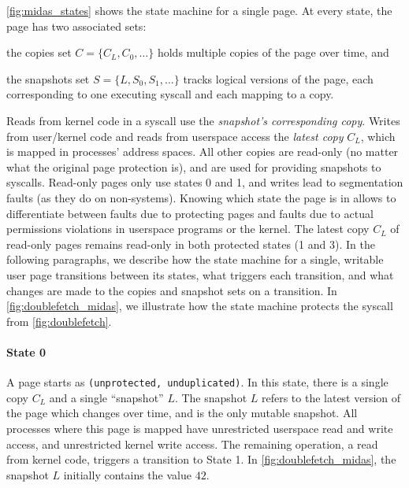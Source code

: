 \documentclass[letterpaper,twocolumn,10pt]{article}
\begin{document}
\autoref{fig:midas_states} shows the state machine for a single page.
At every state, the page has two associated sets:
\begin{inparaenum}
  \item the copies set $C = \{C_L, C_0, \dots\}$ holds multiple copies of the page over time, and
  \item the snapshots set $S = \{L, S_0, S_1, \dots\}$ tracks logical versions of the page, each corresponding to one executing syscall and each mapping to a copy.
\end{inparaenum}
Reads from kernel code in a syscall use the \emph{snapshot's corresponding copy}.
Writes from user/kernel code and reads from userspace access the \emph{latest
copy} $C_L$, which is mapped in processes' address spaces.
All other copies are read-only (no matter what the original page protection is), and are used for providing snapshots to syscalls.
Read-only pages only use states 0 and 1, and writes lead to segmentation faults
(as they do on non-\midas systems).
Knowing which state the page is in allows \midas to differentiate between
faults due to \midas protecting pages and faults due to actual permissions
violations in userspace programs or the kernel.
The latest copy $C_L$ of read-only pages remains read-only in both
protected states (1 and 3).
In the following paragraphs, we describe how the state machine for a single,
writable user page transitions between its states, what triggers each transition,
and what changes are made to the copies and snapshot sets on a transition.
In \autoref{fig:doublefetch_midas}, we illustrate how the state machine protects the
syscall from \autoref{fig:doublefetch}.

\paragraph{State 0}
A page starts as \texttt{(unprotected, unduplicated)}.
In this state, there is a single copy $C_L$ and a single ``snapshot'' $L$.
The snapshot $L$ refers to the latest version of the page which changes
over time, and is the only mutable snapshot.
All processes where this page is mapped have unrestricted userspace read and write
access, and unrestricted kernel write access.
The remaining operation, a read from kernel code, triggers a transition to
State 1.
In \autoref{fig:doublefetch_midas}, the snapshot $L$ initially contains
the value $42$.
\end{document}
